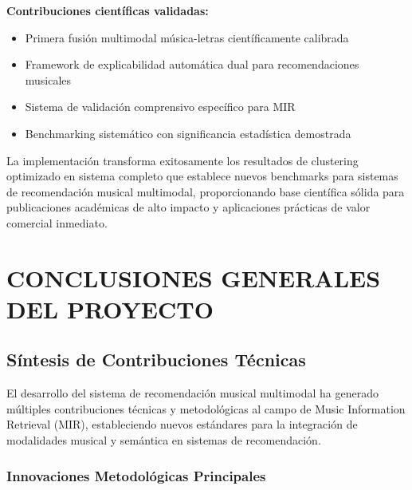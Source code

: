 \documentclass[12pt,a4paper]{report}
\begin{document}
\textbf{Contribuciones científicas validadas:}
\begin{itemize}
    \item Primera fusión multimodal música-letras científicamente calibrada
    \item Framework de explicabilidad automática dual para recomendaciones musicales
    \item Sistema de validación comprensivo específico para MIR
    \item Benchmarking sistemático con significancia estadística demostrada
\end{itemize}

La implementación transforma exitosamente los resultados de clustering optimizado en sistema completo que establece nuevos benchmarks para sistemas de recomendación musical multimodal, proporcionando base científica sólida para publicaciones académicas de alto impacto y aplicaciones prácticas de valor comercial inmediato.

\chapter{CONCLUSIONES GENERALES DEL PROYECTO}

\section{Síntesis de Contribuciones Técnicas}

El desarrollo del sistema de recomendación musical multimodal ha generado múltiples contribuciones técnicas y metodológicas al campo de Music Information Retrieval (MIR), estableciendo nuevos estándares para la integración de modalidades musical y semántica en sistemas de recomendación.

\subsection{Innovaciones Metodológicas Principales}
\end{document}
